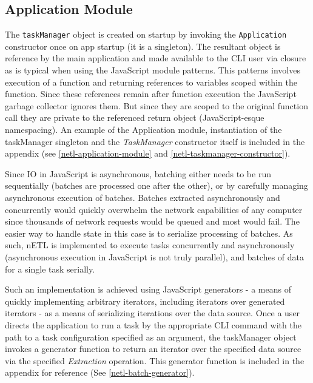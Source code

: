 


\subsection{Application Module}
The \texttt{taskManager} object is created on startup by invoking the \texttt{Application} constructor once on app startup (it is a singleton). The resultant object is reference by the main application and made available to the CLI user via closure as is typical when using the JavaScript module patterns. This patterns involves execution of a function and returning references to variables scoped within the function. Since these references remain after function execution the JavaScript garbage collector ignores them. But since they are scoped to the original function call they are private to the referenced return object (JavaScript-esque namespacing). An example of the Application module, instantiation of the taskManager singleton and the \textit{TaskManager} constructor itself is included in the appendix (see \ref{netl-application-module} and \ref{netl-taskmanager-constructor}).

Since IO in JavaScript is asynchronous, batching either needs to be run sequentially (batches are processed one after the other), or by carefully managing asynchronous execution of batches. Batches extracted asynchronously and concurrently would quickly overwhelm the network capabilities of any computer since thousands of network requests would be queued and most would fail. The easier way to handle state in this case is to serialize processing of batches. As such, nETL is implemented to execute tasks concurrently and asynchronously (asynchronous execution in JavaScript is not truly parallel), and batches of data for a single task serially.

Such an implementation is achieved using JavaScript generators - a means of quickly implementing arbitrary iterators, including iterators over generated iterators \cite{mozillaGenerators} - as a means of serializing iterations over the data source. Once a user directs the application to run a task by the appropriate CLI command with the path to a task configuration specified as an argument, the taskManager object invokes a generator function to return an iterator over the specified data source via the specified \textit{Extraction} operation. This generator function is included in the appendix for reference (See \ref{netl-batch-generator}).

